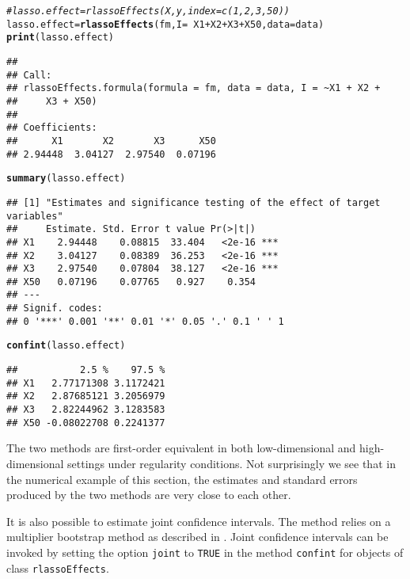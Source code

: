 \documentclass{amsart}\usepackage[]{graphicx}\usepackage[]{color}
\makeatletter
\newcommand{\hlcom}[1]{\textcolor[rgb]{0.678,0.584,0.686}{\textit{#1}}}%
\newcommand{\hlopt}[1]{\textcolor[rgb]{0,0,0}{#1}}%
\newcommand{\hlstd}[1]{\textcolor[rgb]{0.345,0.345,0.345}{#1}}%
\newcommand{\hlkwb}[1]{\textcolor[rgb]{0.69,0.353,0.396}{#1}}%
\newcommand{\hlkwc}[1]{\textcolor[rgb]{0.333,0.667,0.333}{#1}}%
\newcommand{\hlkwd}[1]{\textcolor[rgb]{0.737,0.353,0.396}{\textbf{#1}}}%
\newenvironment{kframe}{%
 \def\at@end@of@kframe{}%
 \ifinner\ifhmode%
  \def\at@end@of@kframe{\end{minipage}}%
  \begin{minipage}{\columnwidth}%
 \fi\fi%
 \def\FrameCommand##1{\hskip\@totalleftmargin \hskip-\fboxsep
 \colorbox{shadecolor}{##1}\hskip-\fboxsep
     \hskip-\linewidth \hskip-\@totalleftmargin \hskip\columnwidth}%
 \MakeFramed {\advance\hsize-\width
   \@totalleftmargin\z@ \linewidth\hsize
   \@setminipage}}%
 {\par\unskip\endMakeFramed%
 \at@end@of@kframe}
\newenvironment{knitrout}{}{} %
\newcommand{\code}[1]{\texttt{#1}}
\makeatother
\begin{document}
\begin{knitrout}
\color{fgcolor}\begin{kframe}
\begin{alltt}
\hlcom{# lasso.effect = rlassoEffects(X, y, index=c(1,2,3,50))}
\hlstd{lasso.effect} \hlkwb{=} \hlkwd{rlassoEffects}\hlstd{(fm,} \hlkwc{I} \hlstd{=} \hlopt{~}\hlstd{X1} \hlopt{+} \hlstd{X2} \hlopt{+} \hlstd{X3} \hlopt{+} \hlstd{X50,} \hlkwc{data} \hlstd{= data)}
\hlkwd{print}\hlstd{(lasso.effect)}
\end{alltt}
\begin{verbatim}
## 
## Call:
## rlassoEffects.formula(formula = fm, data = data, I = ~X1 + X2 + 
##     X3 + X50)
## 
## Coefficients:
##      X1       X2       X3      X50  
## 2.94448  3.04127  2.97540  0.07196
\end{verbatim}
\begin{alltt}
\hlkwd{summary}\hlstd{(lasso.effect)}
\end{alltt}
\begin{verbatim}
## [1] "Estimates and significance testing of the effect of target variables"
##     Estimate. Std. Error t value Pr(>|t|)    
## X1    2.94448    0.08815  33.404   <2e-16 ***
## X2    3.04127    0.08389  36.253   <2e-16 ***
## X3    2.97540    0.07804  38.127   <2e-16 ***
## X50   0.07196    0.07765   0.927    0.354    
## ---
## Signif. codes:  
## 0 '***' 0.001 '**' 0.01 '*' 0.05 '.' 0.1 ' ' 1
\end{verbatim}
\begin{alltt}
\hlkwd{confint}\hlstd{(lasso.effect)}
\end{alltt}
\begin{verbatim}
##           2.5 %    97.5 %
## X1   2.77171308 3.1172421
## X2   2.87685121 3.2056979
## X3   2.82244962 3.1283583
## X50 -0.08022708 0.2241377
\end{verbatim}
\end{kframe}
\end{knitrout}

The two methods are first-order equivalent in both low-dimensional and high-dimensional settings under regularity conditions.  Not surprisingly we see that in the numerical example of this section, the estimates and standard errors produced by the two methods are very close to each other.  

It is also possible to estimate joint confidence intervals. The method relies on a multiplier bootstrap method as described in \cite{BCK2014}. Joint confidence intervals can be invoked by setting the option \code{joint} to \code{TRUE} in the method \code{confint} for objects of class \code{rlassoEffects}.
\end{document}
